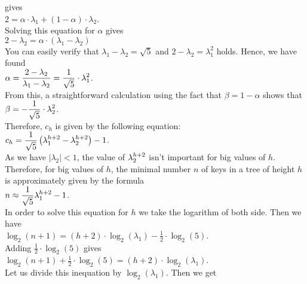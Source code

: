 gives
\\[0.2cm]
\hspace*{1.3cm}
$2 = \alpha \cdot \lambda_1 + (1-\alpha) \cdot \lambda_2$.
\\[0.2cm]
Solving this equation for $\alpha$ gives
\\[0.2cm]
\hspace*{1.3cm}
$2 - \lambda_2 = \alpha \cdot (\lambda_1 - \lambda_2)$
\\[0.2cm]
You can easily verify that $\lambda_1 - \lambda_2 = \sqrt{5}$ and $2 - \lambda_2 = \lambda_1^2$
holds.  Hence, we have found
\\[0.2cm]
\hspace*{1.3cm}
$\displaystyle \alpha = \frac{2 - \lambda_2}{\lambda_1 - \lambda_2} = \frac{1}{\sqrt{5}} \cdot \lambda_1^2$.
\\[0.2cm]
From this, a straightforward calculation using the fact that $\beta = 1 - \alpha$ shows that 
\\[0.2cm]
\hspace*{1.3cm}
$\displaystyle \beta  = -\frac{1}{\sqrt{5}} \cdot \lambda_2^2$.
\\[0.2cm]
Therefore, $c_h$ is given by the following equation:
\\[0.2cm]
\hspace*{1.3cm}
$c_h = \displaystyle \frac{1}{\sqrt{5}} \left( \lambda_1^{h+2} - \lambda_2^{h+2} \right) -1$.  
\\[0.2cm]
As we have  $|\lambda_2| < 1$, the value of  $\displaystyle\lambda_2^{h+2}$ isn't important for big
values of $h$.  Therefore, for big values of $h$, the minimal number  $n$ of keys in a tree of
height  $h$ is approximately given by the formula \\[0.2cm]
\hspace*{1.3cm} $n \approx \displaystyle \frac{1}{\sqrt{5}} \lambda_1^{h+2} - 1$. \\[0.2cm]
In order to solve this equation for  $h$ we take the logarithm of both side.  Then we have
\\[0.2cm]
\hspace*{1.3cm}
$\log_2(n+1) = (h+2) \cdot \log_2(\lambda_1) - \frac{1}{2}\cdot \log_2(5)$.
\\[0.2cm]
Adding  $\frac{1}{2}\cdot \log_2(5)$ gives
\\[0.2cm]
\hspace*{1.3cm}
$\log_2(n+1) + \frac{1}{2}\cdot \log_2(5) = (h+2) \cdot \log_2(\lambda_1)$.
\\[0.2cm]
Let us divide this inequation by  $\log_2(\lambda_1)$.  Then we get
\\[0.4cm]
